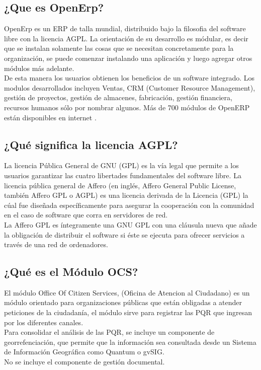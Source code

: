 \subsection{¿Que es OpenErp?}
OpenErp es un ERP de talla mundial, distribuido bajo la filosofia del software libre con la licencia AGPL.
La orientación de su desarrollo es módular, es decir que 
se instalan solamente las cosas que se necesitan concretamente para la organización, se puede comenzar instalando una aplicación y luego 
agregar otros módulos más adelante.\\
De esta manera los usuarios obtienen los beneficios de un software integrado. Los modulos desarrollados incluyen Ventas,
CRM (Customer Resource Management), gestión de proyectos, gestión de almacenes, fabricación, gestión financiera, recursos humanos sólo por nombrar algunos. 
Más de 700 módulos de OpenERP están disponibles en internet \cite{OpenErp}.

\subsection{¿Qué significa la licencia AGPL?}
La licencia  Pública General de GNU (GPL) es la vía legal que permite a los usuarios garantizar las cuatro libertades fundamentales del software libre.
La licencia pública general de Affero (en inglés, Affero General Public License, también Affero GPL o AGPL) es una licencia 
derivada de la Licencia (GPL) la cúal fue diseñada específicamente para asegurar la cooperación con la comunidad
en el caso de software que corra en servidores de red.\\
La Affero GPL es íntegramente una GNU GPL con una cláusula nueva que añade la obligación de distribuir el software si éste se 
ejecuta para ofrecer servicios a través de una red de ordenadores\cite{AGPLexp}.

\subsection {¿Qué es el Módulo OCS?}
El módulo Office Of Citizen Services, (Oficina de Atencion al Ciudadano) es un módulo orientado para organizaciones públicas que están obligadas a 
atender peticiones de la ciudadanía, el módulo sirve para registrar las PQR que 
ingresan por los diferentes canales.\\
Para consolidar el análisis de las PQR, se incluye un componente de georrefenciación, que permite que la información 
sea consultada desde un Sistema de Información Geográfica como Quantum o gvSIG.\\
No se incluye el componente de gestión documental. 